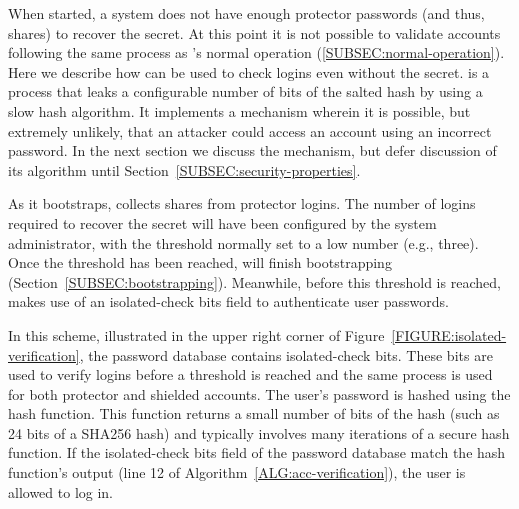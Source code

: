 When started, a \PPH system does not have enough protector passwords (and thus,
shares) to recover the secret.  At this point it is not possible to validate
accounts following the same process as \PPH's normal operation
(\ref{SUBSEC:normal-operation}).  Here we describe how \partialverification  can
be used to check logins even without the secret.  \Partialverification is a
process that leaks a configurable number of bits of the salted hash by using a
slow hash algorithm.  It implements a mechanism wherein it is possible, but
extremely unlikely, that an attacker could access an account using an incorrect
password.  In the next section we discuss the \partialverification mechanism,
but defer discussion of its algorithm until
Section~\ref{SUBSEC:security-properties}.

As it bootstraps, \PPH collects shares from protector logins. The number of
logins required to recover the secret will have been configured by the system
administrator, with the threshold normally set to a low number (e.g., three). 
Once the threshold has been reached, \PPH will finish bootstrapping
(Section~\ref{SUBSEC:bootstrapping}). Meanwhile, before this threshold is
reached, \partialverification makes use of an isolated-check bits field to authenticate
user passwords. 

In this scheme, illustrated in the upper right corner of
Figure~\ref{FIGURE:isolated-verification}, the password database contains
isolated-check bits.  These bits are used to verify logins before a threshold
is reached and the same process is used for both protector and shielded
accounts.  The user's password is hashed using the \partialverification hash
function.  This function returns a small number of bits of the hash (such as 24
bits of a SHA256 hash) and typically involves many iterations of a secure hash
function.  If the isolated-check bits field of the password database match the
\partialverification  hash function’s output (line 12 of
Algorithm~\ref{ALG:acc-verification}), the user is allowed to log in.

